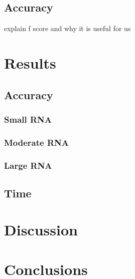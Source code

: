 \documentclass[12pt, a4paper]{article}
\begin{document}
\subsection{Accuracy}
explain f score and why it is useful for us

\section{Results}
\subsection{Accuracy}
\subsubsection{Small RNA}
\subsubsection{Moderate RNA}
\subsubsection{Large RNA}
\subsection{Time}

\section{Discussion}

\section{Conclusions}





\end{document}
